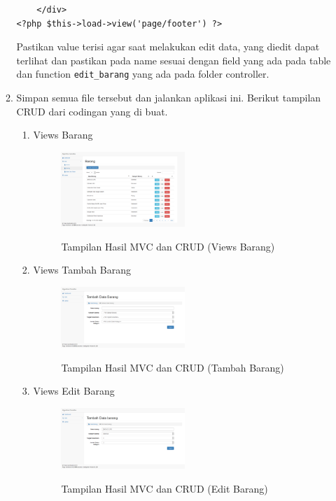 \begin{enumerate}
\begin{enumerate}
\begin{lstlisting}
    </div>
<?php $this->load->view('page/footer') ?>
\end{lstlisting}
    		\par Pastikan value terisi agar saat melakukan edit data, yang diedit dapat terlihat dan pastikan pada name sesuai dengan field yang ada pada table dan function \verb|edit_barang| yang ada pada folder controller.
    		
    	\item Simpan semua file tersebut dan jalankan aplikasi ini. Berikut tampilan CRUD dari codingan yang di buat.
    	\begin{enumerate}
    	    \item Views Barang
    		\begin{figure}[!htbp]
        		\centering
        		\caption{Tampilan Hasil MVC dan CRUD (Views Barang)}
        		\includegraphics[width=0.5\textwidth]{figures/Views5.png}
        		\label{Views5}
    		\end{figure}
    		
    		\item Views Tambah Barang
    		\begin{figure}[!htbp]
        		\centering
        		\caption{Tampilan Hasil MVC dan CRUD (Tambah Barang)}
        		\includegraphics[width=0.5\textwidth]{figures/Views6.png}
        		\label{Views6}
    		\end{figure}
    		
    		\item Views Edit Barang
    		\begin{figure}[!htbp]
        		\centering
        		\caption{Tampilan Hasil MVC dan CRUD (Edit Barang)}
        		\includegraphics[width=0.5\textwidth]{figures/Views7.png}
        		\label{Views7}
    		\end{figure}
    	\end{enumerate}
    \end{enumerate}
\end{enumerate}